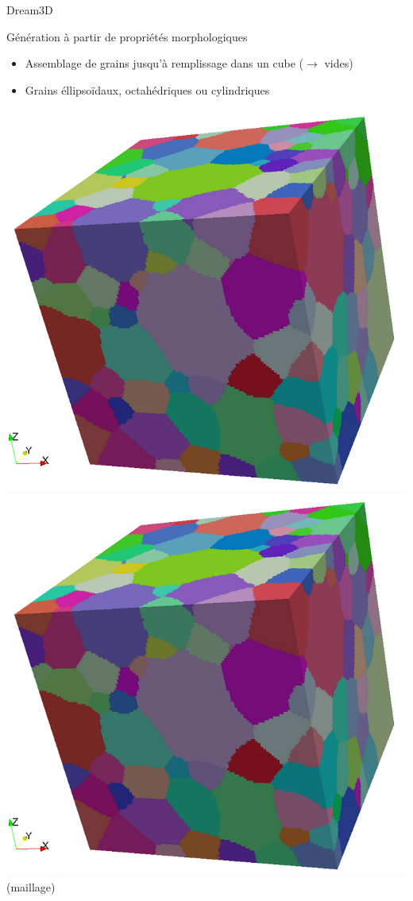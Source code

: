\documentclass[11pt,aspectratio=1610]{beamer}
\begin{document}
\begin{frame}{Dream3D}
  \begin{block}{Génération à partir de propriétés morphologiques \cite{Dream3D}}
    \begin{itemize}
    \item Assemblage de grains jusqu'à remplissage dans un cube ($\rightarrow$ vides)
    \item Grains éllipsoïdaux, octahédriques ou cylindriques
    \end{itemize}
    \centering
    \includegraphics[scale=0.10]{pngFigures/dream3d_cube.png} \qquad\qquad
    \includegraphics[scale=0.10]{pngFigures/dream3d_cube.png} (maillage)

\end{block}
\end{frame}
\end{document}
